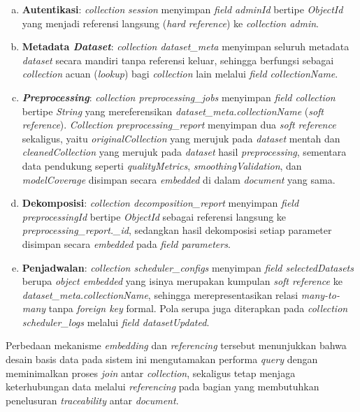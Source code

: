 \begin{enumerate}[(a)]
    \item \textbf{Autentikasi}: \textit{collection} \textit{session} menyimpan \textit{field adminId} bertipe \textit{ObjectId} yang menjadi referensi langsung (\textit{hard reference}) ke \textit{collection admin}.

    \item \textbf{Metadata \textit{Dataset}}: \textit{collection dataset\_meta} menyimpan seluruh metadata \textit{dataset} secara mandiri tanpa referensi keluar, sehingga berfungsi sebagai \textit{collection} acuan (\textit{lookup}) bagi \textit{collection} lain melalui \textit{field collectionName}.

    \item \textbf{\textit{Preprocessing}}: \textit{collection preprocessing\_jobs} menyimpan \textit{field collection} bertipe \textit{String} yang mereferensikan \textit{dataset\_meta.collectionName} (\textit{soft reference}). \textit{Collection preprocessing\_report} menyimpan dua \textit{soft reference} sekaligus, yaitu \textit{originalCollection} yang merujuk pada \textit{dataset} mentah dan \textit{cleanedCollection} yang merujuk pada \textit{dataset} hasil \textit{preprocessing}, sementara data pendukung seperti \textit{qualityMetrics}, \textit{smoothingValidation}, dan \textit{modelCoverage} disimpan secara \textit{embedded} di dalam \textit{document} yang sama.

    \item \textbf{Dekomposisi}: \textit{collection decomposition\_report} menyimpan \textit{field preprocessingId} bertipe \textit{ObjectId} sebagai referensi langsung ke \textit{preprocessing\_report.\_id}, sedangkan hasil dekomposisi setiap parameter disimpan secara \textit{embedded} pada \textit{field parameters}.

    \item \textbf{Penjadwalan}: \textit{collection scheduler\_configs} menyimpan \textit{field selectedDatasets} berupa \textit{object embedded} yang isinya merupakan kumpulan \textit{soft reference} ke \textit{dataset\_meta.collectionName}, sehingga merepresentasikan relasi \textit{many-to-many} tanpa \textit{foreign key} formal. Pola serupa juga diterapkan pada \textit{collection scheduler\_logs} melalui \textit{field datasetUpdated}.
\end{enumerate}

\noindent Perbedaan mekanisme \textit{embedding} dan \textit{referencing} tersebut menunjukkan bahwa desain basis data pada sistem ini mengutamakan performa \textit{query} dengan meminimalkan proses \textit{join} antar \textit{collection}, sekaligus tetap menjaga keterhubungan data melalui \textit{referencing} pada bagian yang membutuhkan penelusuran \textit{traceability} antar \textit{document}.


